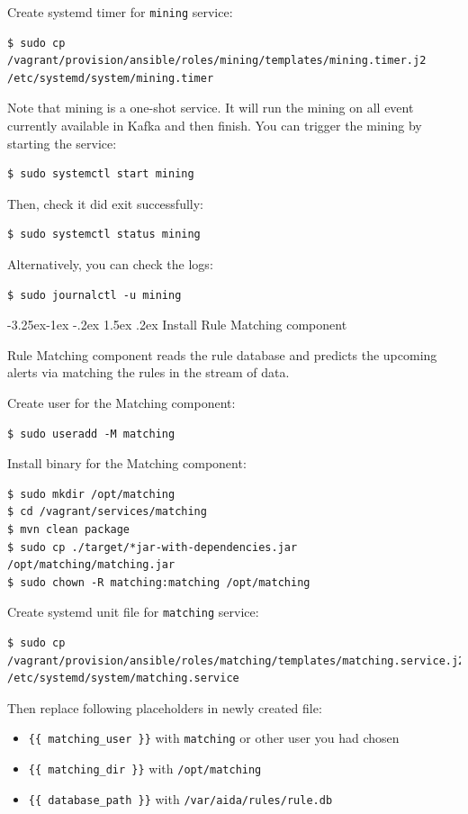 \documentclass[a4paper]{article} %
\makeatletter
\renewcommand{\normalsize}{\fontsize{12}{15}\selectfont\color{textcolor}}
\renewcommand\subsubsection{\@startsection{subsubsection}{3}{\z@}%
                   {-3.25ex\@plus -1ex \@minus -.2ex}%
                   {1.5ex \@plus .2ex}%
                   {\normalfont\sffamily\normalsize\bfseries\color{projectcolor}}}
\makeatother
\begin{document}
Create systemd timer for \texttt{mining} service:
\begin{lstlisting}
$ sudo cp /vagrant/provision/ansible/roles/mining/templates/mining.timer.j2 /etc/systemd/system/mining.timer
\end{lstlisting}

Note that mining is a one-shot service. It will run the mining on all event currently available in Kafka and then finish. You can trigger the mining by starting the service:
\begin{lstlisting}
$ sudo systemctl start mining
\end{lstlisting}

Then, check it did exit successfully:
\begin{lstlisting}
$ sudo systemctl status mining
\end{lstlisting}

Alternatively, you can check the logs:
\begin{lstlisting}
$ sudo journalctl -u mining
\end{lstlisting}


\subsubsection{Install Rule Matching component}

Rule Matching component reads the rule database and predicts the upcoming alerts via matching the rules in the stream of data.

Create user for the Matching component:
\begin{lstlisting}
$ sudo useradd -M matching
\end{lstlisting}

Install binary for the Matching component:
\begin{lstlisting}
$ sudo mkdir /opt/matching
$ cd /vagrant/services/matching
$ mvn clean package
$ sudo cp ./target/*jar-with-dependencies.jar /opt/matching/matching.jar
$ sudo chown -R matching:matching /opt/matching
\end{lstlisting}

Create systemd unit file for \texttt{matching} service:
\begin{lstlisting}
$ sudo cp /vagrant/provision/ansible/roles/matching/templates/matching.service.j2 /etc/systemd/system/matching.service
\end{lstlisting}

Then replace following placeholders in newly created file:
\begin{itemize}[noitemsep,nolistsep]
\item \texttt{\{\{ matching\_user \}\}} with \texttt{matching} or other user you had chosen
\item \texttt{\{\{ matching\_dir \}\}} with \texttt{/opt/matching}
\item \texttt{\{\{ database\_path \}\}} with \texttt{/var/aida/rules/rule.db}
\end{itemize}
\end{document}
